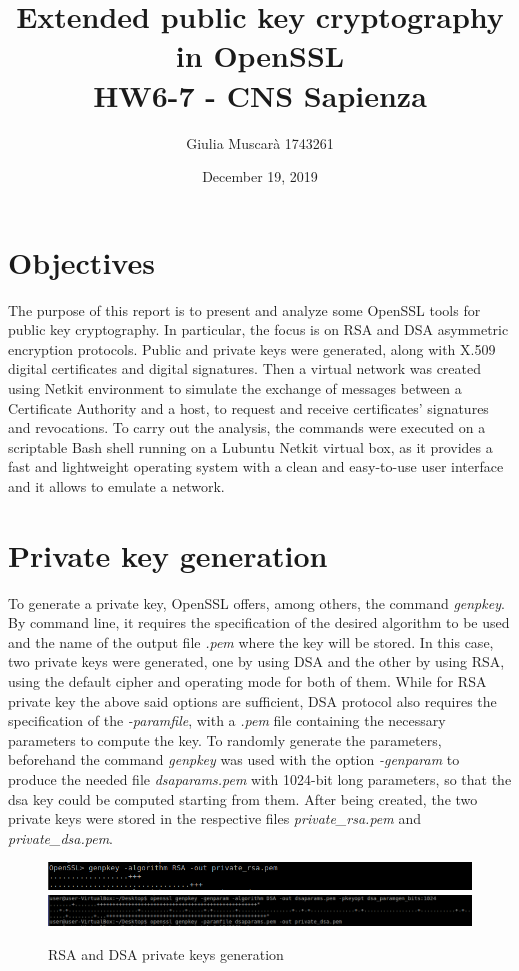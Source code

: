 \documentclass[11pt]{article}
\title{}
\title{%
	Extended public key cryptography in OpenSSL\\
	\large HW6-7 - CNS Sapienza}
\author{Giulia Muscarà 1743261}
\date{December 19, 2019}
\begin{document}
\maketitle
\section{Objectives}
The purpose of this report is to present and analyze some OpenSSL tools for public key cryptography. In particular, the focus is on RSA and DSA asymmetric encryption protocols. Public and private keys were generated, along with X.509 digital certificates and digital signatures. Then a virtual network was created using Netkit environment to simulate the exchange of messages between a Certificate Authority and a host, to request and receive certificates' signatures and revocations. To carry out the analysis, the commands were executed on a scriptable Bash shell running on a Lubuntu Netkit virtual box, as it provides a fast and lightweight operating system with a clean and easy-to-use user interface and it allows to emulate a network. \\

\section{Private key generation}
To generate a private key, OpenSSL offers, among others, the command \textit{genpkey}. By command line, it requires the specification of the desired algorithm to be used and the name of the output file \textit{.pem} where the key will be stored. In this case, two private keys were generated, one by using DSA and the other by using RSA, using the default cipher and operating mode for both of them. While for RSA private key the above said options are sufficient, DSA protocol also requires the specification of the \textit{-paramfile}, with a \textit{.pem} file containing the necessary parameters to compute the key. To randomly generate the parameters, beforehand the command \textit{genpkey} was used with the option \textit{-genparam} to produce the needed file \textit{dsaparams.pem} with 1024-bit long parameters, so that the dsa key could be computed starting from them.
After being created, the two private keys were stored in the respective files \textit{private\_rsa.pem} and \textit{private\_dsa.pem}.

\begin{figure}[H]
	\includegraphics[width=1\textwidth]{img1-hw6-1743261.png}
	\includegraphics[width=1\textwidth]{img2-hw6-1743261.png}
	\caption{RSA and DSA private keys generation}
\end{figure}
\end{document}
